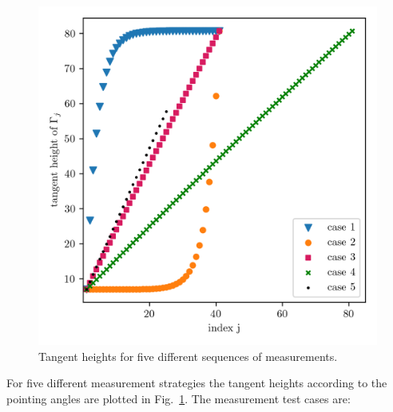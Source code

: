 \begin{figure}[ht!]
	\centering
	\includegraphics{MeasTangHeight.png}
	\caption[Tangent heights for different sequences of measurements.]{Tangent heights for five different sequences of measurements.}
	\label{fig:TangHCases}
\end{figure}
For five different measurement strategies the tangent heights according to the pointing angles are plotted in Fig.~\ref{fig:TangHCases}.
The measurement test cases are:
